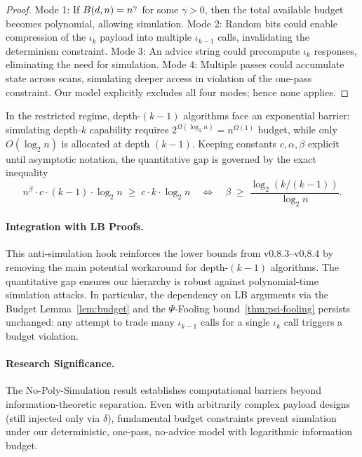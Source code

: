 \begin{proof}
Mode 1: If $\B(d,n) = n^\gamma$ for some $\gamma>0$, then the total available budget becomes polynomial, allowing simulation.
Mode 2: Random bits could enable compression of the $\iota_k$ payload into multiple $\iota_{k-1}$ calls, invalidating the determinism constraint.
Mode 3: An advice string could precompute $\iota_k$ responses, eliminating the need for simulation.
Mode 4: Multiple passes could accumulate state across scans, simulating deeper access in violation of the one-pass constraint.
Our model explicitly excludes all four modes; hence none applies.
\end{proof}

\begin{corollary}
\label{AntiSim:cor:barrier}
In the restricted regime, depth-\((k{-}1)\) algorithms face an exponential barrier: simulating depth-$k$ capability requires $2^{\Omega(\log_{2} n)} = n^{\Omega(1)}$ budget, while only $O(\log_{2} n)$ is allocated at depth $(k{-}1)$. Keeping constants $c,\alpha,\beta$ explicit until asymptotic notation, the quantitative gap is governed by the exact inequality
\[
n^{\beta} \cdot c \cdot (k{-}1) \cdot \log_{2} n
\;\ge\; c \cdot k \cdot \log_{2} n
\quad \Longleftrightarrow \quad
\beta \;\geq\; \frac{\log_{2}(k/(k{-}1))}{\log_{2} n}.
\]
\end{corollary}

\paragraph{Integration with LB Proofs.}
This anti-simulation hook reinforces the lower bounds from v0.8.3--v0.8.4 by removing the main potential workaround for depth-\((k{-}1)\) algorithms. The quantitative gap ensures our hierarchy is robust against polynomial-time simulation attacks. In particular, the dependency on LB arguments via the Budget Lemma~\ref{lem:budget} and the $\Psi$-Fooling bound~\ref{thm:psi-fooling} persists unchanged: any attempt to trade many $\iota_{k-1}$ calls for a single $\iota_k$ call triggers a budget violation.

\paragraph{Research Significance.}
The No-Poly-Simulation result establishes computational barriers beyond information-theoretic separation. Even with arbitrarily complex payload designs (still injected only via $\delta$), fundamental budget constraints prevent simulation under our deterministic, one-pass, no-advice model with logarithmic information budget.


